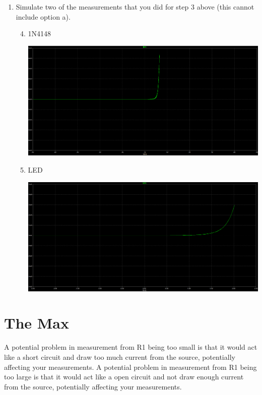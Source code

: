 \documentclass[12pt]{article}
\begin{document}
\begin{enumerate}
    \item Simulate two of the measurements that you did for step 3 above (this cannot include option a).
    \begin{enumerate}
        \setcounter{enumii}{3}
        \item 1N4148 
        \begin{center}
            \includegraphics[width=\linewidth]{images/B4d.png}
        \end{center}
        \pagebreak
        \setcounter{enumii}{5}
        \item LED
        \begin{center}
            \includegraphics[width=\linewidth]{images/B4f.png}
        \end{center}
    \end{enumerate}
\end{enumerate}

\section{The Max}
A potential problem in measurement from R1 being too small is that it would act like a short circuit and draw too much current from the source, potentially affecting your measurements. A potential problem in measurement from R1 being too large is that it would act like a open circuit and not draw enough current from the source, potentially affecting your measurements.

\end{document}
